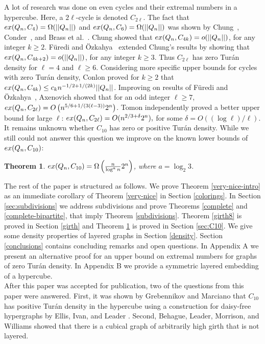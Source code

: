 \documentclass[11pt, a4paper]{article}
\newtheorem{theorem}{Theorem}
\newcommand{\ex}{{\rm  ex}}
\begin{document}
 A lot of research was done on  even cycles and their extremal numbers in a hypercube. Here, a $2\ell$-cycle is  denoted $C_{2\ell}$.
 The fact that $\ex(Q_n, C_4) = \Omega(||Q_n||)$ and $\ex(Q_n, C_6) = \Omega(||Q_n||)$  was shown by Chung~\cite{chung}, Conder~\cite{conder}, and Brass {et al.}~\cite{brass}. Chung \cite{chung} showed that $\ex(Q_n, C_{4k})=o(||Q_n||)$, for any integer $k\geq 2$.
F\"uredi and \"Ozkahya~\cite{FO, FO2}   extended Chung's results by showing that  $\ex(Q_n, C_{4k+2})=o(||Q_n||)$, for any integer $k\geq 3$.
Thus $C_{2\ell}$ has zero Tur\'an density for $\ell= 4$ and $\ell\geq 6$. 
Considering more specific upper bounds for cycles with zero Tur\'an density,  Conlon \cite{C}  proved for $k \geq 2$ that
$\ex(Q_n, C_{4k}) \leq c_k  n^{-1/2 + 1/(2k)}  ||Q_n||$.   Improving on results of F\"uredi and \"Ozkahya~\cite{FO, FO2}, Axenovich \cite{MA}  showed that  for an odd integer $\ell \geq 7$, $\ex(Q_n, C_{2\ell})= O\left(n^{5/6 + 1/(3(\ell-3))} 2^n\right)$. Tomon \cite{T} independently proved a better upper bound for large $\ell$:
$\ex(Q_n, C_{2\ell})= O(n^{2/3+ \delta} 2^n), $ for some $\delta = O((\log \ell) /\ell)$.\\  
 
 It remains unknown whether $C_{10}$ has zero or positive Tur\'an density.
 While we still could not answer this question we improve on the known lower bounds of $\ex(Q_n, C_{10})$: 

\begin{theorem} \label{thm:C10}
$\ex(Q_n, C_{10}) = \Omega\left( \frac{n}{\log^a n} 2^n\right)$, where $a = \log_2 3$.
\end{theorem}

The rest of the paper is structured as follows. We prove Theorem \ref{very-nice-intro} as an immediate corollary of Theorem \ref{very-nice} in Section \ref{colorings}.
In Section \ref{sec:subdivisions} we address subdivisions and prove Theorems \ref{complete} and \ref{complete-bipartite}, that imply Theorem \ref{subdivisions}.
Theorem \ref{girth8} is proved   in Section \ref{girth} and Theorem \ref{thm:C10} is proved   in Section \ref{sec:C10}. 
We give some density properties of layered graphs in Section \ref{density}.
Section \ref{conclusions} contains concluding remarks and open questions. In Appendix A we present an alternative proof for an upper bound on extremal numbers for graphs of zero Tur\'an density. In Appendix B we provide a symmetric layered embedding of a hypercube.\\

 After this paper was accepted for publication, two of the questions from this paper were answered. First, it was shown by Grebennikov and Marciano \cite{GM} that $C_{10}$ has positive Tur\'an density in the hypercube using a construction for daisy-free hypergraphs by  Ellis, Ivan, and Leader \cite{EIL}.  Second,   Behague, Leader,  Morrison,  and Williams \cite{BLMW}   showed that there is a cubical graph of arbitrarily high girth that is not layered. 
\end{document}
